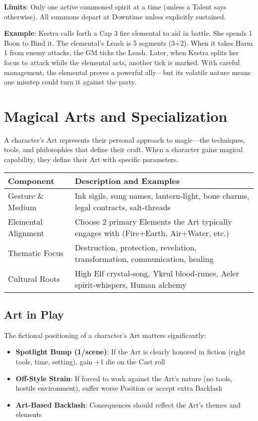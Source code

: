 \textbf{Limits}: Only one active summoned spirit at a time (unless a Talent says otherwise). All summons depart at Downtime unless explicitly sustained.

\textbf{Example}: Kestra calls forth a Cap 3 fire elemental to aid in battle. She spends 1 Boon to Bind it. The elemental's Leash is 5 segments (3+2). When it takes Harm 1 from enemy attacks, the GM ticks the Leash. Later, when Kestra splits her focus to attack while the elemental acts, another tick is marked. With careful management, the elemental proves a powerful ally—but its volatile nature means one misstep could turn it against the party.

\section*{Magical Arts and Specialization}

A character's Art represents their personal approach to magic—the techniques, tools, and philosophies that define their craft. When a character gains magical capability, they define their Art with specific parameters.

\begin{fatebox}
\begin{tabularx}{\textwidth}{lX}
\toprule
\textbf{Component} & \textbf{Description and Examples} \\
\midrule
Gesture \& Medium & Ink sigils, sung names, lantern-light, bone charms, legal contracts, salt-threads \\
Elemental Alignment & Choose 2 primary Elements the Art typically engages with (Fire+Earth, Air+Water, etc.) \\
Thematic Focus & Destruction, protection, revelation, transformation, communication, healing \\
Cultural Roots & High Elf crystal-song, Ykrul blood-runes, Aeler spirit-whispers, Human alchemy \\
\bottomrule
\end{tabularx}
\end{fatebox}

\subsection*{Art in Play}

The fictional positioning of a character's Art matters significantly:

\begin{itemize}
    \item \textbf{Spotlight Bump (1/scene)}: If the Art is clearly honored in fiction (right tools, time, setting), gain +1 die on the Cast roll
    \item \textbf{Off-Style Strain}: If forced to work against the Art's nature (no tools, hostile environment), suffer worse Position or accept extra Backlash
    \item \textbf{Art-Based Backlash}: Consequences should reflect the Art's themes and elements
\end{itemize}

